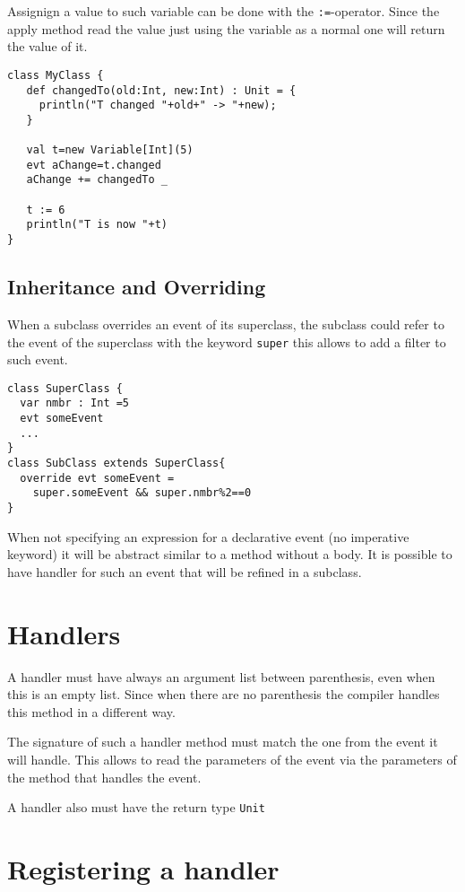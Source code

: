 \documentclass{article}
\begin{document}
Assignign a value to such variable can be done with the {\tt:=}-operator.
Since the apply method read the value just using the variable as
a normal one will return the value of it.

\begin{lstlisting}
class MyClass {
   def changedTo(old:Int, new:Int) : Unit = { 
     println("T changed "+old+" -> "+new);
   }

   val t=new Variable[Int](5)
   evt aChange=t.changed
   aChange += changedTo _

   t := 6
   println("T is now "+t)
}
\end{lstlisting}



\subsection{Inheritance and Overriding} 
When a subclass overrides an event of its superclass, the subclass could
refer to the event of the superclass with the keyword {\tt super}
this allows to add a filter to such event.

\begin{lstlisting}
class SuperClass {
  var nmbr : Int =5
  evt someEvent 
  ...
}
class SubClass extends SuperClass{
  override evt someEvent = 
    super.someEvent && super.nmbr%2==0
}
\end{lstlisting}


When not specifying an expression for a declarative event
(no imperative keyword) it will be abstract similar to a method without 
a body. It is possible to have handler for such an event that will 
be refined in a subclass.

\section{Handlers}
 A handler must have always an argument list between parenthesis,
even when this is an empty list. Since when there are no parenthesis 
the compiler handles this method in a different way. 

The signature of such a handler method must match the one from the
event it will handle. This allows to read the parameters of the
event via the parameters of the method that handles the event.

A handler also must have the return type {\tt Unit} 

\section{Registering a handler}
\end{document}

